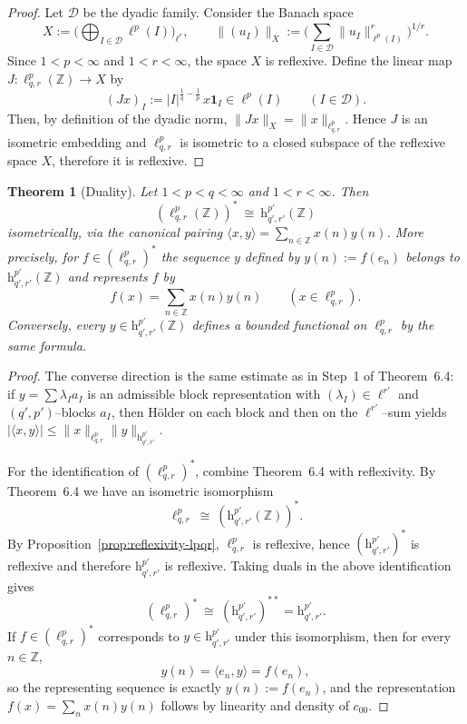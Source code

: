 \documentclass[preprint,12pt]{elsarticle}
\newtheorem{theorem}{Theorem}[section]
\begin{document}
\begin{proof}
Let $\mathcal D$ be the dyadic family. Consider the Banach space
\[
X:=\Big(\bigoplus_{I\in\mathcal D}\ell^p(I)\Big)_{\ell^r},
\qquad
\|(u_I)\|_X:=\Big(\sum_{I\in\mathcal D}\|u_I\|_{\ell^p(I)}^r\Big)^{1/r}.
\]
Since $1<p<\infty$ and $1<r<\infty$, the space $X$ is reflexive.
Define the linear map $J:\ell^{p}_{q,r}(\mathbb Z)\to X$ by
\[
(Jx)_I:=|I|^{\frac1q-\frac1p}\,x\mathbf 1_I\in \ell^p(I)\qquad(I\in\mathcal D).
\]
Then, by definition of the dyadic norm, $\|Jx\|_X=\|x\|_{\ell^{p}_{q,r}}$.
Hence $J$ is an isometric embedding and $\ell^{p}_{q,r}$ is isometric to a closed
subspace of the reflexive space $X$, therefore it is reflexive.
\end{proof}
\begin{theorem}[Duality]\label{thm:duality}
Let $1<p<q<\infty$ and $1<r<\infty$. Then
\[
(\ell^{p}_{q,r}(\mathbb Z))^{*}\ \cong\ \mathrm{h}^{p'}_{q',r'}(\mathbb Z)
\]
isometrically, via the canonical pairing $\langle x,y\rangle=\sum_{n\in\mathbb Z}x(n)y(n)$.
More precisely, for $f\in(\ell^{p}_{q,r})^*$ the sequence $y$ defined by $y(n):=f(e_n)$
belongs to $\mathrm{h}^{p'}_{q',r'}(\mathbb Z)$ and represents $f$ by
\[
f(x)=\sum_{n\in\mathbb Z}x(n)y(n)\qquad(x\in \ell^{p}_{q,r}).
\]
Conversely, every $y\in \mathrm{h}^{p'}_{q',r'}(\mathbb Z)$ defines a bounded functional on
$\ell^{p}_{q,r}$ by the same formula.
\end{theorem}

\begin{proof}
The converse direction is the same estimate as in Step~1 of Theorem~6.4:
if $y=\sum \lambda_I a_I$ is an admissible block representation with
$(\lambda_I)\in\ell^{r'}$ and $(q',p')$--blocks $a_I$, then Hölder on each block and then
on the $\ell^{r'}$--sum yields $|\langle x,y\rangle|\le \|x\|_{\ell^{p}_{q,r}}\|y\|_{\mathrm{h}^{p'}_{q',r'}}$.

For the identification of $(\ell^{p}_{q,r})^*$, combine Theorem~6.4 with reflexivity.
By Theorem~6.4 we have an isometric isomorphism
\[
\ell^{p}_{q,r}\ \cong\ (\mathrm{h}^{p'}_{q',r'}(\mathbb Z))^{*}.
\]
By Proposition~\ref{prop:reflexivity-lpqr}, $\ell^{p}_{q,r}$ is reflexive, hence
$(\mathrm{h}^{p'}_{q',r'})^{*}$ is reflexive and therefore $\mathrm{h}^{p'}_{q',r'}$ is reflexive.
Taking duals in the above identification gives
\[
(\ell^{p}_{q,r})^{*}\ \cong\ (\mathrm{h}^{p'}_{q',r'})^{**}
=\mathrm{h}^{p'}_{q',r'}.
\]
If $f\in(\ell^{p}_{q,r})^*$ corresponds to $y\in \mathrm{h}^{p'}_{q',r'}$ under this isomorphism,
then for every $n\in\mathbb Z$,
\[
y(n)=\langle e_n,y\rangle=f(e_n),
\]
so the representing sequence is exactly $y(n):=f(e_n)$, and the representation
$f(x)=\sum_n x(n)y(n)$ follows by linearity and density of $c_{00}$.
\end{proof}
\end{document}
